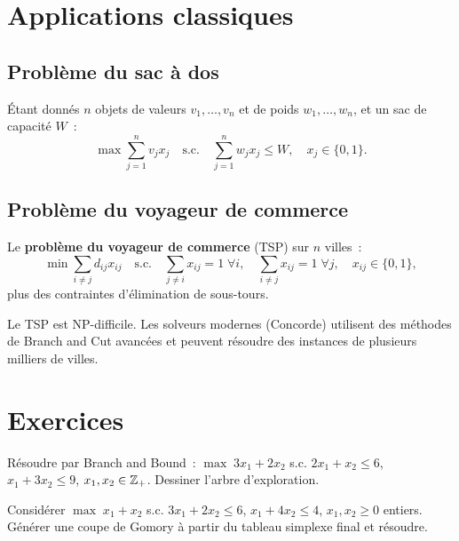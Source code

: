 \section{Applications classiques}

\subsection{Probl\`eme du sac \`a dos}

\begin{definition}
\'Etant donn\'es $n$ objets de valeurs $v_1, \ldots, v_n$ et de poids
$w_1, \ldots, w_n$, et un sac de capacit\'e $W$~:
\[
  \max \sum_{j=1}^n v_j x_j \quad \text{s.c.} \quad
  \sum_{j=1}^n w_j x_j \leq W, \quad x_j \in \{0, 1\}.
\]
\end{definition}

\subsection{Probl\`eme du voyageur de commerce}

\begin{definition}
Le \textbf{probl\`eme du voyageur de commerce} (TSP) sur $n$ villes~:
\[
  \min \sum_{i \ne j} d_{ij} x_{ij} \quad \text{s.c.} \quad
  \sum_{j \ne i} x_{ij} = 1 \;\forall i, \quad
  \sum_{i \ne j} x_{ij} = 1 \;\forall j, \quad
  x_{ij} \in \{0,1\},
\]
plus des contraintes d'\'elimination de sous-tours.
\end{definition}

\begin{attention}[title=\textbf{Complexit\'e du TSP}]
Le TSP est NP-difficile. Les solveurs modernes (Concorde) utilisent des
m\'ethodes de Branch and Cut avanc\'ees et peuvent r\'esoudre des instances
de plusieurs milliers de villes.
\end{attention}

\section{Exercices}

\begin{exercice}
R\'esoudre par Branch and Bound~:
$\max\; 3x_1 + 2x_2$ s.c. $2x_1 + x_2 \leq 6$, $x_1 + 3x_2 \leq 9$,
$x_1, x_2 \in \mathbb{Z}_+$. Dessiner l'arbre d'exploration.
\end{exercice}

\begin{exercice}
Consid\'erer $\max\; x_1 + x_2$ s.c. $3x_1 + 2x_2 \leq 6$,
$x_1 + 4x_2 \leq 4$, $x_1, x_2 \geq 0$ entiers. G\'en\'erer une coupe de
Gomory \`a partir du tableau simplexe final et r\'esoudre.
\end{exercice}

